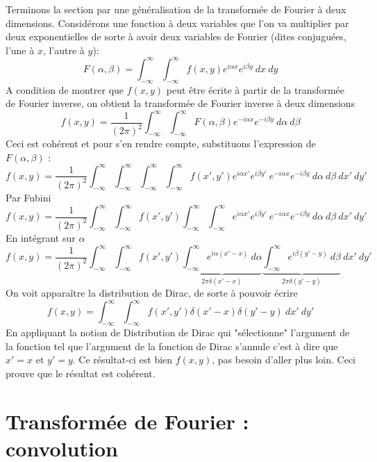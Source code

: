 Terminons la section par une généralisation de la transformée de Fourier à deux dimensions. 
Considérons une fonction à deux variables que l'on va multiplier par deux exponentielles de 
sorte à avoir deux variables de Fourier (dites conjuguées, l'une à $x$, l'autre à $y$):
\begin{equation}
F(\alpha,\beta) = \int_{-\infty}^\infty\int_{-\infty}^\infty f(x,y)e^{i\alpha x}e^{i\beta y}\ 
dx\ dy
\end{equation}
A condition de montrer que $f(x,y)$ peut être écrite à partir de la transformée de Fourier 
inverse, on obtient la transformée de Fourier inverse à deux dimensions
\begin{equation}
f(x,y) = \frac{1}{(2\pi)^2} \int_{-\infty}^\infty\int_{-\infty}^\infty F(\alpha,\beta)
e^{-i\alpha x}e^{-i\beta y}\ d\alpha\ d\beta
\end{equation}
Ceci est cohérent et pour s'en rendre compte, substituons l'expression de $F(\alpha,\beta)$ :
\begin{equation}
f(x,y) = \frac{1}{(2\pi)^2} \int_{-\infty}^\infty\int_{-\infty}^\infty \int_{-\infty}^\infty
\int_{-\infty}^\infty f(x',y')e^{i\alpha x'}e^{i\beta y'}\ e^{-i\alpha x}e^{-i\beta y}\
 d\alpha\ d\beta\ dx'\ dy' 
\end{equation}
Par Fubini
\begin{equation}
f(x,y) = \frac{1}{(2\pi)^2} \int_{-\infty}^\infty\int_{-\infty}^\infty f(x',y') \int_{-\infty}^\infty
\int_{-\infty}^\infty e^{i\alpha x'}e^{i\beta y'}\ e^{-i\alpha x}e^{-i\beta y}\
 d\alpha\ d\beta\ dx'\ dy' 
\end{equation}
En intégrant sur $\alpha$
\begin{equation}
f(x,y) = \frac{1}{(2\pi)^2} \int_{-\infty}^\infty\int_{-\infty}^\infty f(x',y') \underbrace{
\int_{-\infty}^\infty e^{i\alpha(x'-x)}\ d\alpha}_{2\pi\delta(x'-x)} \underbrace{\int_{-\infty}^\infty 
e^{i\beta(y'-y)}\ d\beta}_{2\pi\delta(y'-y)}\ dx'\ dy'
\end{equation}
On voit apparaître la distribution de Dirac, de sorte à pouvoir écrire
\begin{equation}
f(x,y) = \int_{-\infty}^\infty\int_{-\infty}^\infty f(x',y')\delta(x'-x)\delta(y'-y)\ dx'\ dy'
\end{equation}
En appliquant la notion de Distribution de Dirac qui "sélectionne" l'argument de la fonction tel 
que l'argument de la fonction de Dirac s'annule c'est à dire que $x'=x$ et $y'=y$. Ce résultat-ci 
est bien $f(x,y)$, pas besoin d'aller plus loin. Ceci prouve que le résultat est cohérent.





\newpage
\section{Transformée de Fourier : convolution}

























